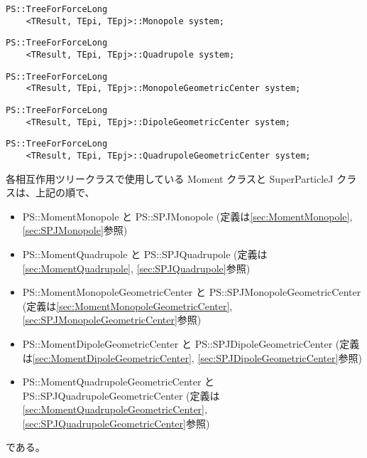 \begin{screen}
\begin{verbatim}
PS::TreeForForceLong
    <TResult, TEpi, TEpj>::Monopole system;
\end{verbatim}
\end{screen}


\begin{screen}
\begin{verbatim}
PS::TreeForForceLong
    <TResult, TEpi, TEpj>::Quadrupole system;
\end{verbatim}
\end{screen}

\begin{screen}
\begin{verbatim}
PS::TreeForForceLong
    <TResult, TEpi, TEpj>::MonopoleGeometricCenter system;
\end{verbatim}
\end{screen}
\begin{screen}
\begin{verbatim}
PS::TreeForForceLong
    <TResult, TEpi, TEpj>::DipoleGeometricCenter system;
\end{verbatim}
\end{screen}

\begin{screen}
\begin{verbatim}
PS::TreeForForceLong
    <TResult, TEpi, TEpj>::QuadrupoleGeometricCenter system;
\end{verbatim}
\end{screen}

各相互作用ツリークラスで使用している Moment クラスと SuperParticleJ クラスは、上記の順で、
\begin{itemize}[itemsep=-1ex]
\item PS::MomentMonopole と PS::SPJMonopole (定義は\ref{sec:MomentMonopole}, \ref{sec:SPJMonopole}参照)
\item PS::MomentQuadrupole と PS::SPJQuadrupole (定義は\ref{sec:MomentQuadrupole}, \ref{sec:SPJQuadrupole}参照)
\item PS::MomentMonopoleGeometricCenter と PS::SPJMonopoleGeometricCenter (定義は\ref{sec:MomentMonopoleGeometricCenter}, \ref{sec:SPJMonopoleGeometricCenter}参照)
\item PS::MomentDipoleGeometricCenter と PS::SPJDipoleGeometricCenter (定義は\ref{sec:MomentDipoleGeometricCenter}, \ref{sec:SPJDipoleGeometricCenter}参照)
\item PS::MomentQuadrupoleGeometricCenter と PS::SPJQuadrupoleGeometricCenter (定義は\ref{sec:MomentQuadrupoleGeometricCenter}, \ref{sec:SPJQuadrupoleGeometricCenter}参照)
\end{itemize}
である。


